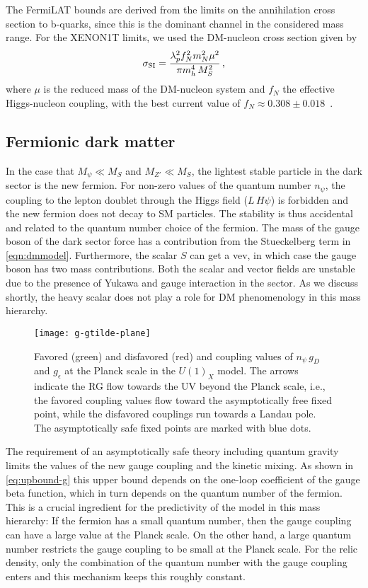 \documentclass[aps,prd,twocolumn,preprintnumbers,superscriptaddress,nobibnotes,floatfix,longbibliography]{revtex4-1}
\begin{document}
The FermiLAT bounds are derived from the limits on the annihilation cross section to b-quarks, since this is the dominant channel in the considered mass range. For the XENON1T limits, we used the DM-nucleon cross section given by 
\begin{align}
\sigma_{\rm SI} = \frac{\lambda_p^2 f_N^2 m_N^2 \mu^2}{\pi m_h^4\,M_S^2}\,,
\end{align}
where $\mu$ is the reduced mass of the DM-nucleon system and $f_N$ the effective Higgs-nucleon coupling, with the best current value of $f_N \approx 0.308 \pm 0.018$~\cite{1708.02245}.

\subsection{Fermionic dark matter}
In the case that $M_\psi  \ll  M_S$ and $M_{Z'}  \ll M_S$, the lightest stable particle in the dark sector is the new fermion.
For non-zero values of the quantum number $n_\psi$, the coupling to the lepton doublet through the Higgs field ($L \,H \psi$)  is forbidden and the new fermion does not decay to SM particles. The stability is thus accidental and related to the quantum number choice of the fermion. The mass of the gauge boson of the dark sector force has a contribution from the Stueckelberg term in \eqref{eqn:dmmodel}. Furthermore, the scalar $S$ can get a vev, in which case the gauge boson has two mass contributions. Both the scalar and vector fields are unstable due to the presence of Yukawa and gauge interaction in the sector.  As we discuss shortly, the heavy scalar does not play a role for DM phenomenology in this mass hierarchy. 

\begin{figure}[t]
\texttt{[image: g-gtilde-plane]}
\caption{
Favored (green) and disfavored (red) and coupling values of $n_\psi\,g_D$ and $g_\epsilon $ at the Planck scale in the $U(1)_X$ model.
The arrows indicate the RG flow towards the UV beyond the Planck scale, i.e.,
the favored coupling values flow toward the asymptotically free fixed point,
while the disfavored couplings run towards a Landau pole.
The asymptotically safe fixed points are marked with blue dots.
}
\label{fig:g-gtilde-plane}
\end{figure}


The requirement of an asymptotically safe theory including quantum gravity limits the values of the new gauge coupling and the kinetic mixing.
As shown in \eqref{eq:upbound-g} this upper bound depends on the one-loop coefficient of the gauge beta function, which in turn depends on the quantum number of the fermion.
This is a crucial ingredient for the predictivity of the model in this mass hierarchy:
If the fermion has a small quantum number, then the gauge coupling can have a large value at the Planck scale.
On the other hand, a large quantum number restricts the gauge coupling to be small at the Planck scale.
For the relic density, only the combination of the quantum number with the gauge coupling enters and this mechanism keeps this roughly constant.
\end{document}
